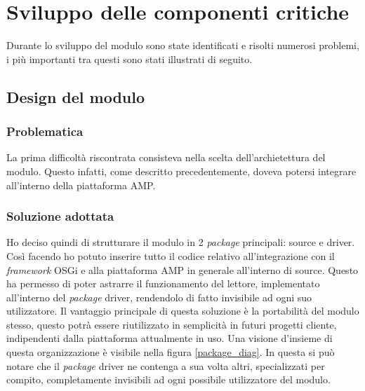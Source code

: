 

\section{Sviluppo delle componenti critiche}
Durante lo sviluppo del modulo sono state identificati e risolti numerosi problemi, i più importanti tra questi sono stati illustrati di seguito.
\subsection{Design del modulo}

\subsubsection*{Problematica}
La prima difficoltà riscontrata consisteva nella scelta dell'archietettura del modulo. Questo infatti, come descritto precedentemente, 
doveva potersi integrare all'interno della piattaforma AMP. 

\subsubsection*{Soluzione adottata}
Ho deciso quindi di strutturare il modulo in 2 \emph{package} principali: source e driver. Così facendo ho potuto inserire tutto
il codice relativo all'integrazione con il \emph{framework} OSGi e alla piattaforma AMP in generale all'interno di source.
Questo ha permesso di poter astrarre il funzionamento del lettore, implementato all'interno del \emph{package} driver, rendendolo
di fatto invisibile ad ogni suo utilizzatore. Il vantaggio principale di questa soluzione è la portabilità del modulo stesso, questo
potrà essere riutilizzato in semplicità in futuri progetti cliente, indipendenti dalla piattaforma attualmente in uso.
Una visione d'insieme di questa organizzazione è visibile nella figura \ref{package_diag}. In questa si può notare che il \emph{package}
driver ne contenga a sua volta altri, specializzati per compito, completamente invisibili ad ogni possibile utilizzatore del
modulo.

